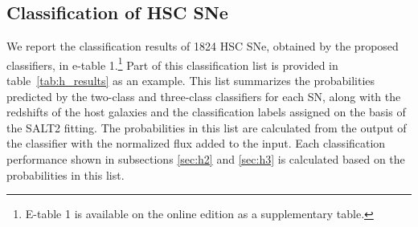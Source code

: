 \documentclass[useamsfonts]{pasj01}
\begin{document}
%
\subsection{Classification of HSC SNe}
%
We report the classification results of 1824 HSC SNe, obtained by the proposed classifiers, in e-table 1.\footnote{ E-table 1 is available on the online edition as a supplementary table. }
Part of this classification list is provided in table\ \ref{tab:h_results} as an example.
This list summarizes the probabilities predicted by the two-class and three-class classifiers for each SN, along with the redshifts of the host galaxies and the classification labels assigned on the basis of the SALT2 fitting.
The probabilities in this list are calculated from the output of the classifier with the normalized flux added to the input.
Each classification performance shown in subsections \ref{sec:h2} and \ref{sec:h3} is calculated based on the probabilities in this list.
\end{document}
